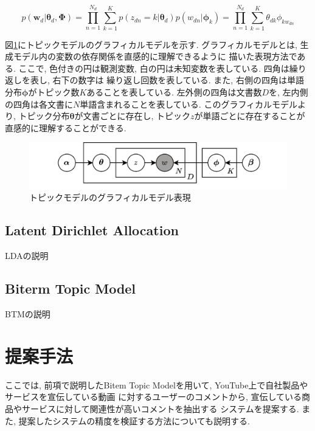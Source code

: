 \documentclass{ltjarticle}
\begin{document}
\begin{equation}
    p(\boldsymbol{w}_d|\boldsymbol{\theta}_d,\boldsymbol{\Phi})=\prod_{n=1}^{N_d}\sum_{k=1}^{K} p(z_{dn}=k|\boldsymbol{\theta}_d)p(w_{dn}|\boldsymbol{\phi}_k)=\prod_{n=1}^{N_d}\sum_{k=1}^{K} \theta_{dk}\phi_{kw_{dn}}
\end{equation}
\vspace{10truept}

図\ref{fig:グラフィカルモデル1}にトピックモデルのグラフィカルモデルを示す. グラフィカルモデルとは, 生成モデル内の変数の依存関係を直感的に理解できるように
描いた表現方法である. ここで, 色付きの円は観測変数, 白の円は未知変数を表している. 四角は繰り返しを表し, 右下の数字は
繰り返し回数を表している. また, 右側の四角は単語分布$\boldsymbol{\phi}$がトピック数$K$あることを表している. 
左外側の四角は文書数$D$を, 左内側の四角は各文書に$N$単語含まれることを表している. 
このグラフィカルモデルより, トピック分布$\boldsymbol{\theta}$が文書ごとに存在し, トピック$z$が単語ごとに存在することが
直感的に理解することができる. 
\begin{figure}[h]
    \centering
    \includegraphics[width = 14.6cm]{images/トピックモデルグラフィカルモデル.drawio.png}
    \caption{トピックモデルのグラフィカルモデル表現}
    \label{fig:グラフィカルモデル1}
\end{figure}




\newpage
\subsection{Latent Dirichlet Allocation}
LDAの説明
\subsection{Biterm Topic Model}
BTMの説明

\newpage
\section{提案手法}
ここでは, 前項で説明したBitem Topic Modelを用いて, YouTube上で自社製品やサービスを宣伝している動画
に対するユーザーのコメントから, 宣伝している商品やサービスに対して関連性が高いコメントを抽出する
システムを提案する. また, 提案したシステムの精度を検証する方法についても説明する. 
\end{document}

